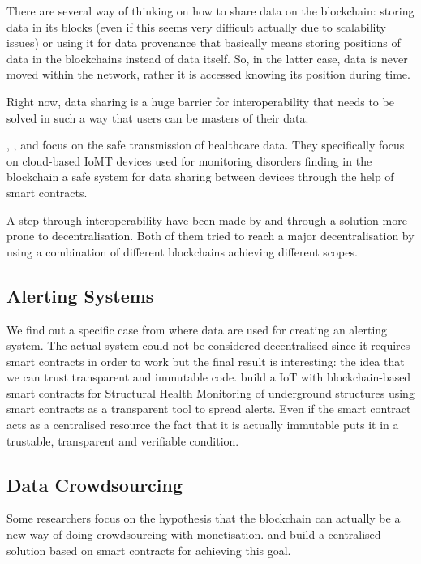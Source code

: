 \documentclass[preprint]{elsarticle}
\begin{document}
There are several way of thinking on how to share data on the blockchain: storing data in its blocks (even if this seems very difficult actually due to scalability issues) or using it for data provenance that basically means storing positions of data in the blockchains instead of data itself. So, in the latter case, data is never moved within the network, rather it is accessed knowing its position during time.

Right now, data sharing is a huge barrier for interoperability that needs to be solved in such a way that users can be masters of their data.

\citet{nguyen2019mobile}, \citet{dey2017healthsense}, \citet{azbeg2018blockchain} and \citet{nguyen2019mobile} focus on the safe transmission of healthcare data. They specifically focus on cloud-based IoMT devices used for monitoring disorders finding in the blockchain a safe system for data sharing between devices through the help of smart contracts. 

A step through interoperability have been made by \citet{jiang2018blochie} and \citet{xu2019healthchain} through a solution more prone to decentralisation. Both of them tried to reach a major decentralisation by using a combination of different blockchains achieving different scopes.

\subsection{Alerting Systems}
We find out a specific case from where data are used for creating an alerting system. The actual system could not be considered decentralised since it requires smart contracts in order to work but the final result is interesting: the idea that we can trust transparent and immutable code. \citet{jo2018hybrid} build a IoT with blockchain-based smart contracts for Structural Health Monitoring of underground structures using smart contracts as a transparent tool to spread alerts. Even if the smart contract acts as a centralised resource the fact that it is actually immutable puts it in a trustable, transparent and verifiable condition. 

\subsection{Data Crowdsourcing}
Some researchers focus on the hypothesis that the blockchain can actually be a new way of doing crowdsourcing with monetisation. \citet{fernandez2019enabling} and \citet{rupasinghe2019towards} build a centralised solution based on smart contracts for achieving this goal.
\end{document}
